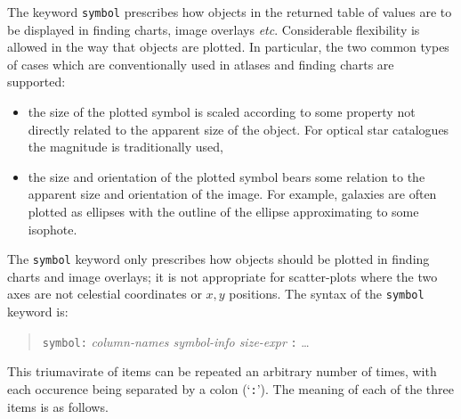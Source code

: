\documentclass[twoside,11pt,nolof,chapters]{starlink}
\begin{document}
The keyword \texttt{symbol} prescribes how objects in the returned table
of values are to be displayed in finding charts, image overlays \emph{etc}.
Considerable flexibility is allowed in the way that objects are plotted.
In particular, the two common types of cases which are conventionally used
in atlases and finding charts are supported:

\begin{itemize}

  \item the size of the plotted symbol is scaled according to some
   property not directly related to the apparent size of the object.
   For optical star catalogues the magnitude is traditionally used,

  \item the size and orientation of the plotted symbol bears some
   relation to the apparent size and orientation of the image.  For
   example, galaxies are often plotted as ellipses with the outline of
   the ellipse approximating to some isophote.

\end{itemize}

The \texttt{symbol} keyword only prescribes how objects should be plotted
in finding charts and image overlays; it is not appropriate for
scatter-plots where the two axes are not celestial coordinates or $x,y$\/
positions.  The syntax of the \texttt{symbol} keyword is:

\begin{quote}
\texttt{symbol:} \textit{column-names symbol-info size-expr}\/ \texttt{:} \ldots
\end{quote}

This triumavirate of items can be repeated an arbitrary number of times,
with each occurence being separated by a colon (`\texttt{:}').  The meaning
of each of the three items is as follows.
\end{document}

